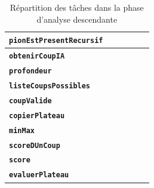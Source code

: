 \documentclass[11pt]{report}
\begin{document}
\begin{table}[h]
\begin{center}
\begin{tabular}{|l|c|c|c|c|c|}
 		\textbf{\texttt{pionEstPresentRecursif}} & \cellcolor{lightgray} & \cellcolor{lightgray} & \cellcolor{lightgray} & & \\\hline
 		\textbf{\texttt{obtenirCoupIA}} & & & &  \cellcolor{lightgray}&  \cellcolor{lightgray}  \\\hline
 		 		\textbf{\texttt{profondeur}} & & & &  \cellcolor{lightgray}&  \cellcolor{lightgray}  \\\hline
 		 		 		\textbf{\texttt{listeCoupsPossibles}} & & & &  \cellcolor{lightgray}&  \cellcolor{lightgray}  \\\hline
 		  		\textbf{\texttt{coupValide}} & & & &  \cellcolor{lightgray}&  \cellcolor{lightgray}  \\\hline
  		\textbf{\texttt{copierPlateau}} & & & &  \cellcolor{lightgray}&  \cellcolor{lightgray}  \\\hline
   		\textbf{\texttt{minMax}} & & & &  \cellcolor{lightgray}&  \cellcolor{lightgray}  \\\hline
   		 		\textbf{\texttt{scoreDUnCoup}} & & & &  \cellcolor{lightgray}&  \cellcolor{lightgray}  \\\hline
   	 		\textbf{\texttt{score}} & & & &  \cellcolor{lightgray}&  \cellcolor{lightgray}  \\\hline
   	 		 		\textbf{\texttt{evaluerPlateau}} & & & &  \cellcolor{lightgray}&  \cellcolor{lightgray}  \\\hline
\end{tabular}
\end{center}
\caption{Répartition des tâches dans la phase d'analyse descendante}
\end{table}
\end{document}

